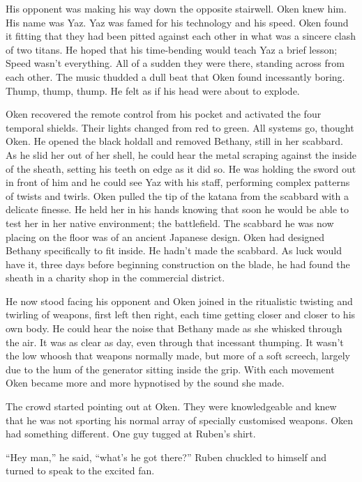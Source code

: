 His opponent was making his way down the opposite stairwell. Oken knew him. His name was Yaz. Yaz was famed for his technology and his speed. Oken found it fitting that they had been pitted against each other in what was a sincere clash of two titans. He hoped that his time-bending would teach Yaz a brief lesson; Speed wasn't everything. All of a sudden they were there, standing across from each other. The music thudded a dull beat that Oken found incessantly boring. Thump, thump, thump. He felt as if his head were about to explode.

Oken recovered the remote control from his pocket and activated the four temporal shields. Their lights changed from red to green. All systems go, thought Oken. He opened the black holdall and removed Bethany, still in her scabbard. As he slid her out of her shell, he could hear the metal scraping against the inside of the sheath, setting his teeth on edge as it did so. He was holding the sword out in front of him and he could see Yaz with his staff, performing complex patterns of twists and twirls. Oken pulled the tip of the katana from the scabbard with a delicate finesse. He held her in his hands knowing that soon he would be able to test her in her native environment; the battlefield. The scabbard he was now placing on the floor was of an ancient Japanese design. Oken had designed Bethany specifically to fit inside. He hadn't made the scabbard. As luck would have it, three days before beginning construction on the blade, he had found the sheath in a charity shop in the commercial district.

He now stood facing his opponent and Oken joined in the ritualistic twisting and twirling of weapons, first left then right, each time getting closer and closer to his own body. He could hear the noise that Bethany made as she whisked through the air. It was as clear as day, even through that incessant thumping. It wasn't the low whoosh that weapons normally made, but more of a soft screech, largely due to the hum of the generator sitting inside the grip. With each movement Oken became more and more hypnotised by the sound she made.

The crowd started pointing out at Oken. They were knowledgeable and knew that he was not sporting his normal array of specially customised weapons. Oken had something different. One guy tugged at Ruben's shirt.

``Hey man,'' he said, ``what's he got there?'' Ruben chuckled to himself and turned to speak to the excited fan.

